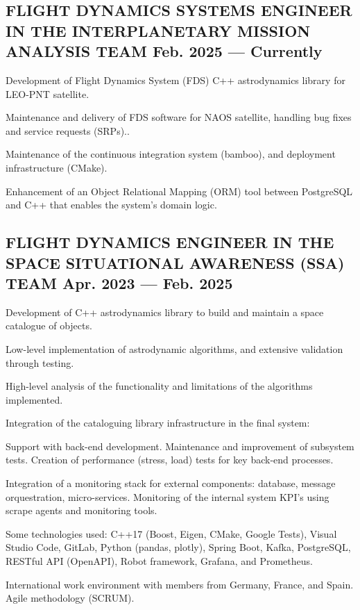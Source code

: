 \documentclass[letter,10pt]{article}
\begin{document}
\subsection{{FLIGHT DYNAMICS SYSTEMS ENGINEER IN THE INTERPLANETARY MISSION ANALYSIS TEAM \hfill Feb. 2025  --- Currently}}
\begin{zitemize}
\item Development of Flight Dynamics System (FDS) C++ astrodynamics library for LEO-PNT satellite. 
\item Maintenance and delivery of FDS software for NAOS satellite, handling bug fixes and service requests (SRPs).. 
\item Maintenance of the continuous integration system (bamboo), and deployment infrastructure (CMake).
\item Enhancement of an Object Relational Mapping (ORM) tool between PostgreSQL and C++ that enables the system's domain logic.
\end{zitemize}

\subsection{{FLIGHT DYNAMICS ENGINEER IN THE SPACE SITUATIONAL AWARENESS (SSA) TEAM \hfill Apr. 2023  --- Feb. 2025}}
\begin{zitemize}
\item Development of C++ astrodynamics library to build and maintain a space catalogue of objects.
\begin{zitemize}
    \item Low-level implementation of astrodynamic algorithms, and extensive validation through testing.
    \item High-level analysis of the functionality and limitations of the algorithms implemented.
\end{zitemize}
\item Integration of the cataloguing library infrastructure in the final system:
\begin{zitemize}
    \item Support with back-end development. Maintenance and improvement of subsystem tests. Creation of performance (stress, load) tests for key back-end processes. 
    \item Integration of a monitoring stack for external components: database, message orquestration, micro-services. Monitoring of the internal system KPI's using scrape agents and monitoring tools.
\end{zitemize}
\item Some technologies used: C++17 (Boost, Eigen, CMake, Google Tests), Visual Studio Code, GitLab, Python (pandas, plotly), Spring Boot, Kafka, PostgreSQL, RESTful API (OpenAPI), Robot framework, Grafana, and Prometheus.

\item International work environment with members from Germany, France, and Spain. Agile methodology (SCRUM).
\end{zitemize}
\end{document}
